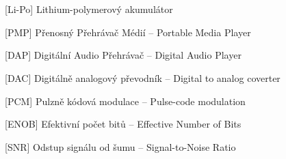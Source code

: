 \cleardoublepage
\chapter*{\listofabbrevname}
{}

\begin{acronym}[KolikMista]





		[Li-Po]
		{Lithium-polymerový akumulátor}

		[PMP]
		{Přenosný Přehrávač Médií -- Portable Media Player}

		[DAP]
		{Digitální Audio Přehrávač -- Digital Audio Player}

		[DAC]
		{Digitálně analogový převodník -- Digital to analog coverter}

        [PCM]
        {Pulzně kódová modulace -- Pulse-code modulation}

        [ENOB]
        {Efektivní počet bitů -- Effective Number of Bits}	

		[SNR]
		{Odstup signálu od šumu -- Signal-to-Noise Ratio}

\end{acronym}
